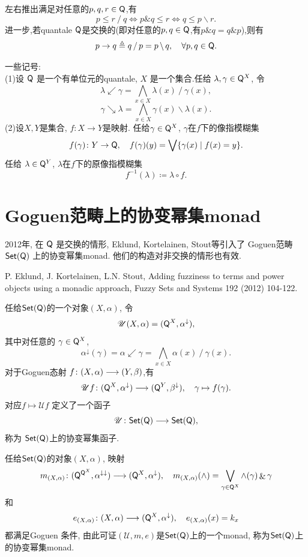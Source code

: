 \documentclass[UTF8]{beamer}
\theoremstyle{definition}
\theoremstyle{definition}
\DeclareMathOperator{\ldd}{/}
\DeclareMathOperator{\rdd}{\backslash}
\DeclareMathOperator{\with}{\&}
\newcommand{\sQ}{{\sf Q}}
\newcommand{\setQ}{{\sf Set}(\sQ)}
\newcommand{\bv}{\bigvee}
\newcommand{\bw}{\bigwedge}
\newcommand{\ra}{\rightarrow}
\numberwithin{equation}{section}
\begin{document}
\begin{frame}
左右推出满足对任意的$p,q,r\in \sQ$,有$$p\leqslant r\ldd q\Longleftrightarrow p\with q\leqslant r\Longleftrightarrow q\leqslant p\rdd r.$$进一步,若quantale $\sQ$是交换的(即对任意的$p,q\in \sQ$,有$p\with q=q\with p$),则有
$$p\ra q\triangleq q\ldd p=p\rdd q,\quad\forall p,q\in\sQ.$$
\end{frame}

\begin{frame}
一些记号:\\
(1)设 $\sQ$ 是一个有单位元的quantale, $X$ 是一个集合.任给 $\lambda,\gamma\in\sQ^X$,  令$$\lambda\swarrow\gamma=\bigwedge\limits_{x\in X}\lambda(x)\ldd\gamma(x),$$	$$\gamma\searrow\lambda=\bigwedge\limits_{x\in X}\gamma(x)\rdd \lambda(x).$$  
\pause
(2)设$X,Y$是集合, $f\colon X\longrightarrow Y$是映射. 任给$\gamma\in \sQ^X$, $\gamma$在$f$下的像指模糊集  $$f(\gamma)\colon Y\to \sQ,\quad f(\gamma)(y)=\bigvee\{\gamma(x)\mid f(x)=y\}.$$   任给 $\lambda\in \sQ^{Y}$, $\lambda$在$f$下的原像指模糊集 $$f^{-1}(\lambda)\coloneqq \lambda\circ f .$$ 
\end{frame}

\section{Goguen范畴上的协变幂集monad}
\begin{frame}	2012年, 在 $\sQ$ 是交换的情形,  Eklund, Kortelainen, Stout等引入了	Goguen范畴 $\setQ$ 上的协变幂集monad. 他们的构造对非交换的情形也有效.

\vskip 11pt

{\footnotesize P. Eklund, J. Kortelainen, L.N. Stout, Adding fuzziness to terms and power objects using a monadic approach, Fuzzy Sets and Systems 192 (2012) 104-122.}
\end{frame}

\begin{frame}	任给$\setQ$的一个对象$(X,\alpha)$, 令 \[\mathscr{U}(X,\alpha)=(\sQ^X,\alpha^\downarrow),\] 其中对任意的 $\gamma\in\sQ^X$,  $$\alpha^\downarrow(\gamma)=\alpha\swarrow\gamma=\bw_{x\in X}\alpha(x)\ldd\gamma(x).$$   对于Goguen态射 $f\colon(X,\alpha)\longrightarrow(Y,\beta)$,有 \[\mathscr{U} f\colon(\sQ^X,\alpha^\downarrow)\lra (\sQ^Y,\beta^\downarrow), \quad \gamma\mapsto f(\gamma).\]  对应$f\mapsto \mathscr{U} f$ 定义了一个函子 \[\mathscr{U}\colon\setQ\lra\setQ,\] 称为 $\setQ$上的协变幂集函子.
\end{frame}

\begin{frame} 任给$\setQ$的对象$(X,\alpha)$, 映射
$$ m_{(X,\alpha)}\colon (\sQ^{\sQ^X},\alpha^{\downarrow\downarrow})\lra (\sQ^X,\alpha^\downarrow),\quad  m_{(X,\alpha)}(\land)= \bv_{\gamma\in\sQ^X}\land(\gamma)\with\gamma $$  和 \[ e_{(X,\alpha)}\colon (X,\alpha)\lra (\sQ^X,\alpha^\downarrow),\quad  e_{(X,\alpha)}(x) =k_x \] 都满足Goguen 条件, 由此可证$(\mathscr{U}, m, e)$是$\setQ$上的一个monad, 称为$\setQ$上的协变幂集monad. 
\end{frame}
\end{document}
